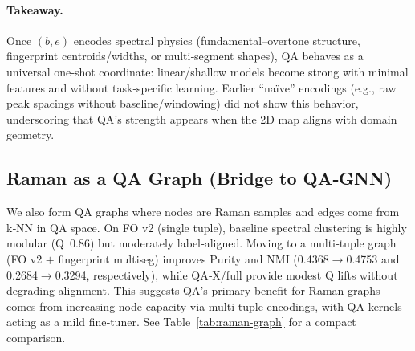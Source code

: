 \paragraph{Takeaway.}
Once \((b,e)\) encodes spectral physics (fundamental–overtone structure, fingerprint centroids/widths, or multi‑segment shapes), QA behaves as a universal one‑shot coordinate: linear/shallow models become strong with minimal features and without task‑specific learning. Earlier “naïve” encodings (e.g., raw peak spacings without baseline/windowing) did not show this behavior, underscoring that QA’s strength appears when the 2D map aligns with domain geometry.

\subsection{Raman as a QA Graph (Bridge to QA‑GNN)}

We also form QA graphs where nodes are Raman samples and edges come from k‑NN in QA space. On FO v2 (single tuple), baseline spectral clustering is highly modular (Q~0.86) but moderately label‑aligned. Moving to a multi‑tuple graph (FO v2 $+$ fingerprint multiseg) improves Purity and NMI (0.4368$\to$0.4753 and 0.2684$\to$0.3294, respectively), while QA‑X/full provide modest Q lifts without degrading alignment. This suggests QA’s primary benefit for Raman graphs comes from increasing node capacity via multi‑tuple encodings, with QA kernels acting as a mild fine‑tuner. See Table~\ref{tab:raman-graph} for a compact comparison.
